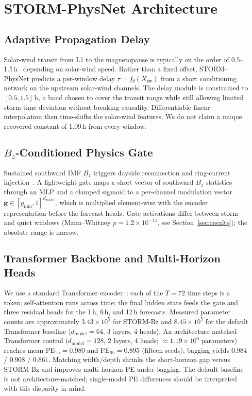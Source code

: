 \documentclass[conference]{IEEEtran}
\begin{document}
\section{STORM-PhysNet Architecture}

\subsection{Adaptive Propagation Delay}
Solar-wind transit from L1 to the magnetopause is typically on the order of 0.5--1.5\,h~\cite{b14} depending on solar-wind speed. Rather than a fixed offset, STORM-PhysNet predicts a per-window delay \(\tau = f_\theta(X_{\mathrm{sw}})\) from a short conditioning network on the upstream solar-wind channels. The delay module is constrained to \([0.5, 1.5]\,\mathrm{h}\), a band chosen to cover the transit range while still allowing limited storm-time deviation without breaking causality. Differentiable linear interpolation then time-shifts the solar-wind features. We do not claim a unique recovered constant of 1.09\,h from every window.

\subsection{\(B_z\)-Conditioned Physics Gate}
Sustained southward IMF \(B_z\) triggers dayside reconnection and ring-current
injection~\cite{b2}. A lightweight gate maps a short vector of
southward-\(B_z\) statistics through an MLP and a clamped sigmoid to a
per-channel modulation vector \(\mathbf{g}\in[g_{\min},1]^{d_{\mathrm{model}}}\), which is multiplied element-wise with the encoder representation
before the forecast heads. Gate activations differ between storm and quiet windows
(Mann--Whitney \(p = 1.2\times10^{-14}\), see Section~\ref{sec:results}); the absolute range
is narrow.

\subsection{Transformer Backbone and Multi-Horizon Heads}
We use a standard Transformer encoder~\cite{b16}: each of the \(T=72\)
time steps is a token; self-attention runs across time; the final hidden state
feeds the gate and three residual heads for the 1\,h, 6\,h, and 12\,h
forecasts. Measured parameter counts are approximately $3.43\times10^{5}$ for
STORM-Bz and $8.45\times10^{5}$ for the default Transformer baseline
($d_{\mathrm{model}}=64$, 3 layers, 4 heads). An architecture-matched Transformer
control ($d_{\mathrm{model}}=128$, 2 layers, 4 heads; $\approx1.19\times10^{6}$
parameters) reaches mean PE$_{1\mathrm{h}}=0.980$ and PE$_{6\mathrm{h}}=0.895$
(fifteen seeds); bagging yields $0.984$ / $0.908$ / $0.861$. Matching width/depth
shrinks the short-horizon gap versus STORM-Bz and improves multi-horizon PE under
bagging. The default baseline is not architecture-matched; single-model PE differences
should be interpreted with this disparity in mind.
\end{document}
